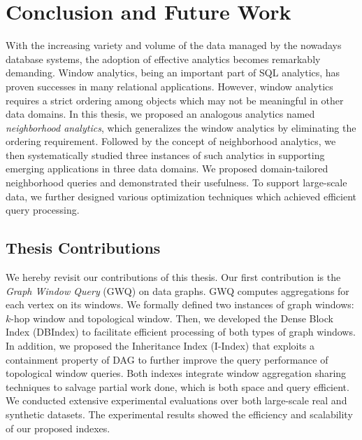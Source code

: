 \chapter{Conclusion and Future Work}
With the increasing variety and volume of the data managed
by the nowadays database systems, the adoption of effective 
analytics becomes remarkably demanding. 
Window analytics, being
an important part of SQL analytics, has proven successes in
many relational applications. However, window analytics requires a
strict ordering among objects which may not be meaningful
in other data domains.  In this thesis, we proposed
an analogous analytics named \emph{neighborhood analytics},
which generalizes the window analytics by eliminating the
ordering requirement. Followed by the concept of
neighborhood analytics, we then systematically studied
three instances of such analytics in supporting emerging applications
in three data domains.
We proposed domain-tailored neighborhood queries and demonstrated
their usefulness. To support large-scale data, 
we further designed various optimization techniques which achieved
efficient query processing.

\section{Thesis Contributions}
We hereby revisit our contributions of this thesis. Our first
contribution is the \emph{Graph Window Query} (GWQ) on data graphs. 
GWQ computes aggregations for each vertex on its windows.
We formally defined two instances of graph windows: $k$-hop window and topological window. 
Then, we developed the Dense Block Index (DBIndex) to facilitate efficient 
processing of both types of graph windows. In addition, 
we proposed the Inheritance Index (I-Index) that exploits a
containment property of DAG to further improve the query performance of topological window queries. 
Both indexes integrate window aggregation sharing techniques to salvage partial work done, 
which is both space and query efficient. 
We conducted extensive experimental evaluations over both large-scale real and synthetic datasets. The experimental results showed the efficiency and scalability of our proposed indexes. 

